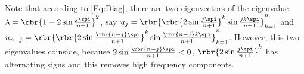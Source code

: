 \documentclass[english, nochinese]{pkupaper}
\begin{document}
Note that according to \eqref{Eq:Diag}, there are two eigenvectors of the eigenvalue $ \lambda = \rbr{ 1 - 2 \sin \frac{ j \spi }{ n + 1 } }^2 $, say $ u_j = \rbr{ \rbr{ 2 \sin \frac{ j \spi }{ n + 1 } }^k \sin \frac{ j k \spi }{ n + 1 } }_{ k = 1 }^n $ and $ u_{ n - j } = \rbr{ \rbr{ 2 \sin \frac{ \rbr{ n - j } \spi }{ n + 1 } }^k \sin \frac{ \rbr{ n  - j } k \spi }{ n + 1 } }_{ k = 1 }^n $. However, this two eigenvalues coinside, because $ 2 \sin \frac{ \rbr{ n - j } \spi }{ n + 1 } < 0 $, $\rbr{ 2 \sin \frac{ j \spi }{ n + 1 } }^k$ has alternating signs and this removes high frequency components.
\end{document}
